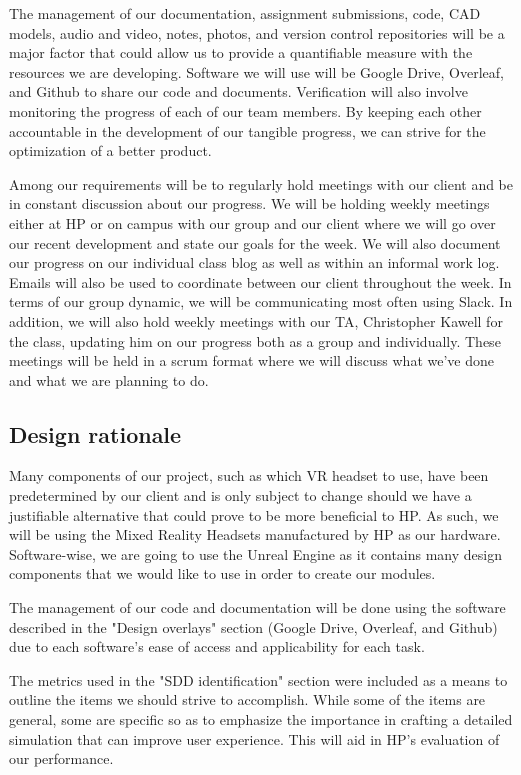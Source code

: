 \documentclass[onecolumn, draftclsnofoot,10pt, compsoc]{IEEEtran}
\begin{document}
The management of our documentation, assignment submissions, code, CAD models, audio and video, notes, photos, and version control repositories will be a major factor that could allow us to provide a quantifiable measure with the resources we are developing. Software we will use will be Google Drive, Overleaf, and Github to share our code and documents. Verification will also involve monitoring the progress of each of our team members. By keeping each other accountable in the development of our tangible progress, we can strive for the optimization of a better product. 

Among our requirements will be to regularly hold meetings with our client and be in constant discussion about our progress. We will be holding weekly meetings either at HP or on campus with our group and our client where we will go over our recent development and state our goals for the week. We will also document our progress on our individual class blog as well as within an informal work log. Emails will also be used to coordinate between our client throughout the week. In terms of our group dynamic, we will be communicating most often using Slack. In addition, we will also hold weekly meetings with our TA, Christopher Kawell for the class, updating him on our progress both as a group and individually. These meetings will be held in a scrum format where we will discuss what we've done and what we are planning to do. 
\subsection{Design rationale}
Many components of our project, such as which VR headset to use, have been predetermined by our client and is only subject to change should we have a justifiable alternative that could prove to be more beneficial to HP. As such, we will be using the Mixed Reality Headsets manufactured by HP as our hardware. Software-wise, we are going to use the Unreal Engine as it contains many design components that we would like to use in order to create our modules. 

The management of our code and documentation will be done using the software described in the "Design overlays" section (Google Drive, Overleaf, and Github) due to each software's ease of access and applicability for each task. 

The metrics used in the "SDD identification" section were included as a means to outline the items we should strive to accomplish. While some of the items are general, some are specific so as to emphasize the importance in crafting a detailed simulation that can improve user experience. This will aid in HP's evaluation of our performance. 
\end{document}

